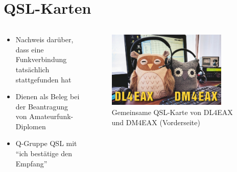 
\section{QSL-Karten}
\label{section:qsl_karten}
\begin{frame}%

\begin{columns}
    \begin{column}{0.48\textwidth}
    \begin{itemize}
  \item Nachweis darüber, dass eine Funkverbindung tatsächlich stattgefunden hat
  \item Dienen als Beleg bei der Beantragung von Amateurfunk-Diplomen
  \item Q-Gruppe QSL mit \enquote{ich bestätige den Empfang}
  \end{itemize}

    \end{column}
   \begin{column}{0.48\textwidth}
       
\begin{figure}
    \includegraphics[width=0.85\textwidth]{foto/12}
    \caption{\scriptsize Gemeinsame QSL-Karte von DL4EAX und DM4EAX (Vorderseite)}
    \label{n_qsl_karten_vorderseite}
\end{figure}

   \end{column}
\end{columns}

\end{frame}

